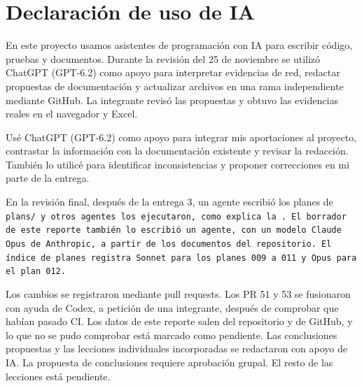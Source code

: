 \FloatBarrier
\section{Declaración de uso de IA}\label{sec:ia}

En este proyecto usamos asistentes de programación con IA para escribir código, pruebas y documentos. Durante la revisión del 25 de noviembre se utilizó ChatGPT (GPT-6.2) como apoyo para interpretar evidencias de red, redactar propuestas de documentación y actualizar archivos en una rama independiente mediante GitHub. La integrante revisó las propuestas y obtuvo las evidencias reales en el navegador y Excel.

Usé ChatGPT (GPT-6.2) como apoyo para integrar mis aportaciones al proyecto, contrastar la información con la documentación existente y revisar la redacción. También lo utilicé para identificar inconsistencias y proponer correcciones en mi parte de la entrega.


En la revisión final, después de la entrega 3, un agente escribió los planes de \tt{plans/} y otros agentes los ejecutaron, como explica la . El borrador de este reporte también lo escribió un agente, con un modelo Claude Opus de Anthropic, a partir de los documentos del repositorio. El índice de planes registra Sonnet para los planes 009 a 011 y Opus para el plan 012.

Los cambios se registraron mediante pull requests. Los PR 51 y 53 se fusionaron con ayuda de Codex, a petición de una integrante, después de comprobar que habían pasado CI. Los datos de este reporte salen del repositorio y de GitHub, y lo que no se pudo comprobar está marcado como pendiente. Las conclusiones propuestas y las lecciones individuales incorporadas se redactaron con apoyo de IA. La propuesta de conclusiones requiere aprobación grupal. El resto de las lecciones está pendiente.
